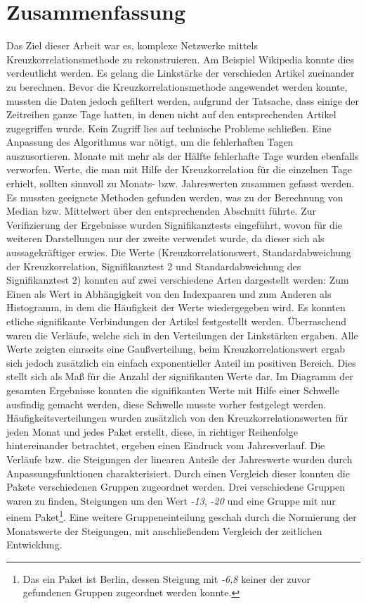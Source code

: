 \documentclass[fontsize=11pt, twoside, a4paper]{scrartcl}
\begin{document}
\section{Zusammenfassung}
Das Ziel dieser Arbeit war es, komplexe Netzwerke mittels Kreuzkorrelationsmethode zu rekonstruieren. Am Beispiel Wikipedia konnte dies verdeutlicht werden. Es gelang die Linkstärke der verschieden Artikel zueinander zu berechnen. Bevor die Kreuzkorrelationsmethode angewendet werden konnte, mussten die Daten jedoch gefiltert werden, aufgrund der Tatsache, dass einige der Zeitreihen ganze Tage hatten, in denen nicht auf den entsprechenden Artikel zugegriffen wurde. Kein Zugriff lies auf technische Probleme schließen. Eine Anpassung des Algorithmus war nötigt, um die fehlerhaften Tagen auszusortieren. Monate mit mehr als der Hälfte fehlerhafte Tage wurden ebenfalls verworfen. Werte, die man mit Hilfe der Kreuzkorrelation für die einzelnen Tage erhielt, sollten sinnvoll zu Monats- bzw. Jahreswerten zusammen gefasst werden. Es mussten geeignete Methoden gefunden werden, was zu der Berechnung von Median bzw. Mittelwert über den entsprechenden Abschnitt führte. Zur Verifizierung der Ergebnisse wurden Signifikanztests eingeführt, wovon für die weiteren Darstellungen nur der zweite verwendet wurde, da dieser sich als aussagekräftiger erwies. Die Werte (Kreuzkorrelationswert, Standardabweichung der Kreuzkorrelation, Signifikanztest 2 und Standardabweichung des Signifikanztest 2) konnten auf zwei verschiedene Arten dargestellt werden: Zum Einen als Wert in Abhängigkeit von den Indexpaaren und zum Anderen als Histogramm, in dem die Häufigkeit der Werte wiedergegeben wird. Es konnten etliche signifikante Verbindungen der Artikel festgestellt werden. Überraschend waren die Verläufe, welche sich in den Verteilungen der Linkstärken ergaben. Alle Werte zeigten einrseits eine Gaußverteilung, beim Kreuzkorrelationswert ergab sich jedoch zusätzlich ein einfach exponentieller Anteil im positiven Bereich. Dies stellt sich als Maß für die Anzahl der signifikanten Werte dar. Im Diagramm der gesamten Ergebnisse konnten die signifikanten Werte mit Hilfe einer Schwelle ausfindig gemacht werden, diese Schwelle musste vorher festgelegt werden.\\
Häufigkeitsverteilungen wurden zusätzlich von den Kreuzkorrelationswerten für jeden Monat und jedes Paket erstellt, diese, in richtiger Reihenfolge hintereinander betrachtet, ergeben einen Eindruck vom Jahresverlauf. Die Verläufe bzw. die Steigungen der linearen Anteile der Jahreswerte wurden durch Anpassungsfunktionen charakterisiert. Durch einen Vergleich dieser konnten die Pakete verschiedenen Gruppen zugeordnet werden. Drei verschiedene Gruppen waren zu finden, Steigungen um den Wert \textit{-13}, \textit{-20} und eine Gruppe mit nur einem Paket\footnote{Das ein Paket ist Berlin, dessen Steigung mit \textit{-6,8} keiner der zuvor gefundenen Gruppen zugeordnet werden konnte.}. Eine weitere Gruppeneinteilung geschah durch die Normierung der Monatswerte der Steigungen, mit anschließendem Vergleich der zeitlichen Entwicklung. \\
\end{document}
